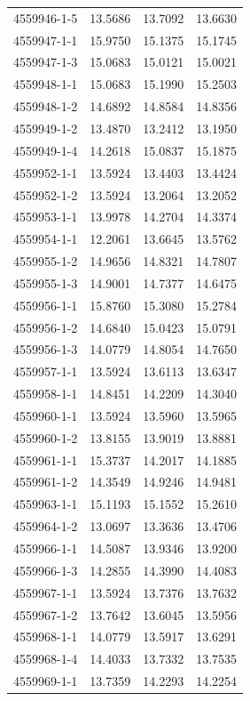 \begin{longtable}{lrrr}
4559946-1-5 & 13.5686 & 13.7092 & 13.6630 \\
4559947-1-1 & 15.9750 & 15.1375 & 15.1745 \\
4559947-1-3 & 15.0683 & 15.0121 & 15.0021 \\
4559948-1-1 & 15.0683 & 15.1990 & 15.2503 \\
4559948-1-2 & 14.6892 & 14.8584 & 14.8356 \\
4559949-1-2 & 13.4870 & 13.2412 & 13.1950 \\
4559949-1-4 & 14.2618 & 15.0837 & 15.1875 \\
4559952-1-1 & 13.5924 & 13.4403 & 13.4424 \\
4559952-1-2 & 13.5924 & 13.2064 & 13.2052 \\
4559953-1-1 & 13.9978 & 14.2704 & 14.3374 \\
4559954-1-1 & 12.2061 & 13.6645 & 13.5762 \\
4559955-1-2 & 14.9656 & 14.8321 & 14.7807 \\
4559955-1-3 & 14.9001 & 14.7377 & 14.6475 \\
4559956-1-1 & 15.8760 & 15.3080 & 15.2784 \\
4559956-1-2 & 14.6840 & 15.0423 & 15.0791 \\
4559956-1-3 & 14.0779 & 14.8054 & 14.7650 \\
4559957-1-1 & 13.5924 & 13.6113 & 13.6347 \\
4559958-1-1 & 14.8451 & 14.2209 & 14.3040 \\
4559960-1-1 & 13.5924 & 13.5960 & 13.5965 \\
4559960-1-2 & 13.8155 & 13.9019 & 13.8881 \\
4559961-1-1 & 15.3737 & 14.2017 & 14.1885 \\
4559961-1-2 & 14.3549 & 14.9246 & 14.9481 \\
4559963-1-1 & 15.1193 & 15.1552 & 15.2610 \\
4559964-1-2 & 13.0697 & 13.3636 & 13.4706 \\
4559966-1-1 & 14.5087 & 13.9346 & 13.9200 \\
4559966-1-3 & 14.2855 & 14.3990 & 14.4083 \\
4559967-1-1 & 13.5924 & 13.7376 & 13.7632 \\
4559967-1-2 & 13.7642 & 13.6045 & 13.5956 \\
4559968-1-1 & 14.0779 & 13.5917 & 13.6291 \\
4559968-1-4 & 14.4033 & 13.7332 & 13.7535 \\
4559969-1-1 & 13.7359 & 14.2293 & 14.2254 \\

\end{longtable}

